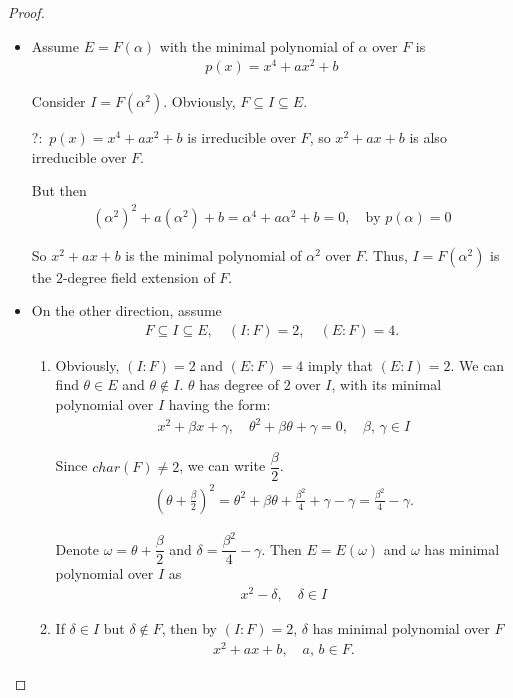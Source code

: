 \documentclass[utf8]{ctexbook}
\theoremstyle{definition}
\begin{document}
\begin{proof}
\begin{itemize}
\item{Assume $E=F(\alpha)$ with the minimal polynomial of $\alpha$ over $F$ is
\begin{align*}
p(x) = x^4 + ax^2 + b
\end{align*}

Consider $I = F(\alpha^2)$. Obviously, $F \subseteq I \subseteq E$.

{\color{red} $?:$ $p(x) = x^4 + ax^2 + b $ is irreducible over $F$, so $x^2 + ax + b$ is also irreducible over $F$.}

But then
\begin{align*}
(\alpha^2)^2 + a (\alpha^2) + b = \alpha^4 + a \alpha^2 + b = 0, \quad \mbox{by } p(\alpha) = 0
\end{align*}

So $x^2 + a x + b $ is the minimal polynomial of $\alpha^2$ over $F$. Thus, $I = F(\alpha^2)$ is the 
$2$-degree field extension of $F$.
}
\item{On the other direction, assume 
\begin{align*}
F \subseteq I \subseteq E, \quad (I:F)=2, \quad (E:F)=4 .
\end{align*}


\begin{enumerate}
\item{Obviously, $(I:F)=2$ and $(E:F)=4$ imply that $(E:I) = 2$. We can find $\theta \in E$ and $\theta \not \in I$. $\theta $ has degree of $2$ over $I$, with its minimal polynomial over $I$ having the form:
\begin{align*}
x^2 + \beta x + \gamma , \quad \theta ^2 + \beta \theta + \gamma = 0, \quad \beta, \, \gamma \in I
\end{align*}

Since $char(F) \neq 2$, we can write $\dfrac{\beta}{2}$.
\begin{align*}
(\theta + \frac{\beta}{2})^2 = \theta^2 + \beta \theta + \frac{\beta^2}{4} + \gamma - \gamma = \frac{\beta^2}{4} - \gamma .
\end{align*}

Denote $\omega = \theta + \dfrac{\beta}{2}$ and $\delta = \dfrac{\beta^2}{4} - \gamma$. Then $E = E(\omega)$ and $\omega$ has minimal polynomial over $I$ as 
\begin{align*}
x^2 - \delta , \quad \delta \in I
\end{align*}
}
\item{\label{exercise_4_3_3_step2}If $\delta \in I$ but $\delta \not \in F$, then by $(I:F)=2$, $\delta$ has minimal polynomial over $F$ 
\begin{align*}
x^2 + a x + b, \quad a, \, b \in F .
\end{align*}

}
\end{enumerate}}
\end{itemize}
\end{proof}
\end{document}
